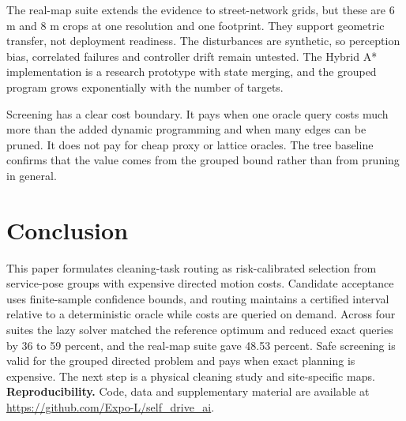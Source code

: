 \documentclass[conference]{IEEEtran}
\begin{document}
The real-map suite extends the evidence to street-network grids, but these are 6 m and 8 m crops at one resolution and one footprint. They support geometric transfer, not deployment readiness. The disturbances are synthetic, so perception bias, correlated failures and controller drift remain untested. The Hybrid A* implementation is a research prototype with state merging, and the grouped program grows exponentially with the number of targets.

Screening has a clear cost boundary. It pays when one oracle query costs much more than the added dynamic programming and when many edges can be pruned. It does not pay for cheap proxy or lattice oracles. The tree baseline confirms that the value comes from the grouped bound rather than from pruning in general.

\section{Conclusion}

This paper formulates cleaning-task routing as risk-calibrated selection from service-pose groups with expensive directed motion costs. Candidate acceptance uses finite-sample confidence bounds, and routing maintains a certified interval relative to a deterministic oracle while costs are queried on demand. Across four suites the lazy solver matched the reference optimum and reduced exact queries by 36 to 59 percent, and the real-map suite gave 48.53 percent. Safe screening is valid for the grouped directed problem and pays when exact planning is expensive. The next step is a physical cleaning study and site-specific maps. \textbf{Reproducibility.} Code, data and supplementary material are available at \url{https://github.com/Expo-L/self_drive_ai}.
\end{document}
